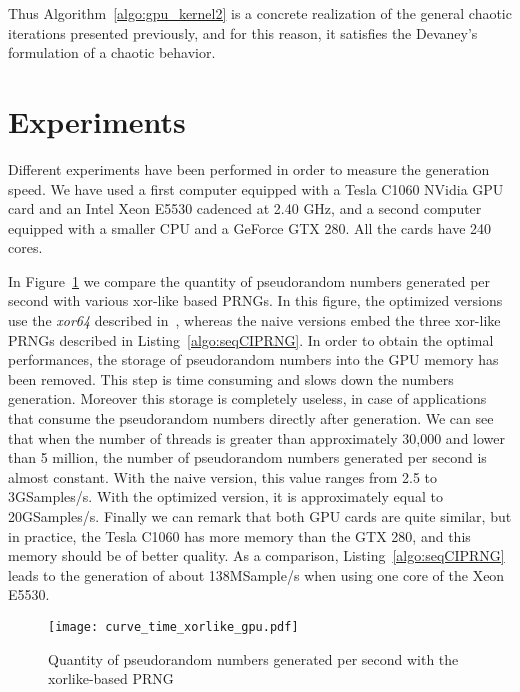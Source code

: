 \documentclass{article}
\begin{document}
Thus Algorithm~\ref{algo:gpu_kernel2} is a concrete realization of the general
chaotic iterations presented previously, and for this reason, it satisfies the 
Devaney's formulation of a chaotic behavior.

\section{Experiments}
\label{sec:experiments}

Different experiments  have been  performed in order  to measure  the generation
speed. We have used a first computer equipped with a Tesla C1060 NVidia  GPU card
and an
Intel  Xeon E5530 cadenced  at 2.40  GHz,  and 
a second computer  equipped with a smaller  CPU and  a GeForce GTX  280. 
All the
cards have 240 cores.

In  Figure~\ref{fig:time_xorlike_gpu} we  compare the  quantity of  pseudorandom numbers
generated per second with various xor-like based PRNGs. In this figure, the optimized
versions use the {\it xor64} described in~\cite{Marsaglia2003}, whereas the naive versions
embed  the three  xor-like  PRNGs described  in Listing~\ref{algo:seqCIPRNG}.   In
order to obtain the optimal performances, the storage of pseudorandom numbers
into the GPU memory has been removed. This step is time consuming and slows down the numbers
generation.  Moreover this   storage  is  completely
useless, in case of applications that consume the pseudorandom
numbers  directly   after generation. We can see  that when the number of  threads is greater
than approximately 30,000 and lower than 5 million, the number of pseudorandom numbers generated
per second  is almost constant.  With the  naive version, this value ranges from 2.5 to
3GSamples/s.   With  the  optimized   version,  it  is  approximately  equal to
20GSamples/s. Finally  we can remark  that both GPU  cards are quite  similar, but in
practice,  the Tesla C1060  has more  memory than  the GTX  280, and  this memory
should be of better quality.
As a  comparison,   Listing~\ref{algo:seqCIPRNG}  leads   to the  generation of  about
138MSample/s when using one core of the Xeon E5530.

\begin{figure}[htbp]
\begin{center}
  \texttt{[image: curve\_time\_xorlike\_gpu.pdf]}
\end{center}
\caption{Quantity of pseudorandom numbers generated per second with the xorlike-based PRNG}
\label{fig:time_xorlike_gpu}
\end{figure}
\end{document}

